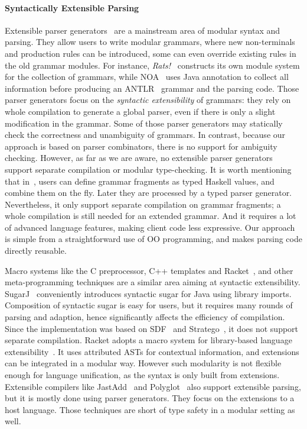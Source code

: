 \paragraph{Syntactically Extensible Parsing}
Extensible parser generators~\cite{antlr1995,Grimm2006,Gouseti2014,Viera2012,Warth2016}
are a mainstream area of modular syntax and parsing. They allow users to write
modular grammars, where new
non-terminals and production rules can be introduced, some can even
override existing rules in the old grammar modules. For instance,
\textit{Rats!}~\cite{Grimm2006} constructs its own module system for
the collection of grammars, while NOA~\cite{Gouseti2014} uses Java
annotation to collect all information before producing an ANTLR~\cite{antlr1995} grammar
and the parsing code. Those parser
generators focus on the \textit{syntactic extensibility} of grammars:
they rely on whole compilation to generate a global parser, even if
there is only a slight modification in the grammar. Some of those
parser generators may statically check the correctness and unambiguity
of grammars. In contrast, because our approach is based on parser
combinators, there is no support for ambiguity checking.  However, as
far as we are aware, no extensible parser generators support separate
compilation or modular type-checking. It is worth mentioning that in~\cite{Viera2012}, users can define
grammar fragments as typed Haskell values, and combine them on the fly. Later they are processed
by a typed parser generator. Nevertheless, it only support separate compilation
on grammar fragments; a whole compilation is still needed for an extended grammar. And it requires
a lot of advanced language features, making client code less expressive. Our approach is simple from a
straightforward use of OO programming, and makes parsing code directly reusable.

Macro systems like the C preprocessor, C++ templates and
Racket~\cite{Tobin-Hochstadt2011}, and other meta-programming
techniques are a similar area aiming at syntactic extensibility.
SugarJ~\cite{Erdweg2011} conveniently introduces syntactic sugar for
Java using library imports. Composition of syntactic sugar is easy for
users, but it requires many rounds of parsing and adaption, hence
significantly affects the efficiency of compilation. Since the
implementation was based on SDF~\cite{Heering1989} and
Stratego~\cite{Visser2001}, it does not support separate
compilation. Racket adopts a macro system for library-based language
extensibility~\cite{Tobin-Hochstadt2011}. It uses
attributed ASTs for contextual
information, and extensions can be integrated in a modular
way. However such modularity is not flexible enough for language
unification, as the syntax is only built from extensions.
Extensible
compilers like JastAdd~\cite{Ekman2007} and
Polyglot~\cite{Nystrom2003} also support extensible parsing, but it
is mostly done using parser generators. They focus on the
extensions to a host language. Those techniques are short of type safety in a modular
setting as well.

